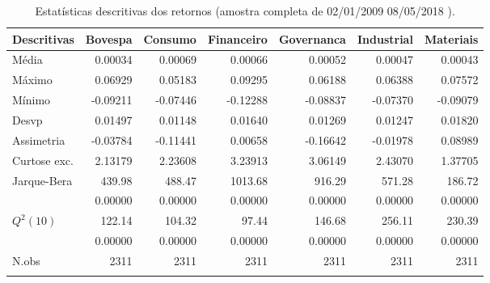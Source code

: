 \begin{longtable}{lrrrrrr}
\caption{Estatísticas descritivas dos retornos (amostra completa de 02/01/2009 08/05/2018 ).} \\ 
  \toprule
Descritivas & Bovespa & Consumo & Financeiro & Governanca & Industrial & Materiais \\ 
  \midrule
Média & 0.00034 & 0.00069 & 0.00066 & 0.00052 & 0.00047 & 0.00043 \\ 
  Máximo & 0.06929 & 0.05183 & 0.09295 & 0.06188 & 0.06388 & 0.07572 \\ 
  Mínimo & -0.09211 & -0.07446 & -0.12288 & -0.08837 & -0.07370 & -0.09079 \\ 
  Desvp & 0.01497 & 0.01148 & 0.01640 & 0.01269 & 0.01247 & 0.01820 \\ 
  Assimetria & -0.03784 & -0.11441 & 0.00658 & -0.16642 & -0.01978 & 0.08989 \\ 
  Curtose exc. & 2.13179 & 2.23608 & 3.23913 & 3.06149 & 2.43070 & 1.37705 \\ 
  Jarque-Bera & 439.98 & 488.47 & 1013.68 & 916.29 & 571.28 & 186.72 \\ 
   & 0.00000 & 0.00000 & 0.00000 & 0.00000 & 0.00000 & 0.00000 \\ 
  $Q^2(10)$ & 122.14 & 104.32 & 97.44 & 146.68 & 256.11 & 230.39 \\ 
   & 0.00000 & 0.00000 & 0.00000 & 0.00000 & 0.00000 & 0.00000 \\ 
  N.obs & 2311 & 2311 & 2311 & 2311 & 2311 & 2311 \\ 
   \bottomrule
\label{tab:descritivas}
\end{longtable}
